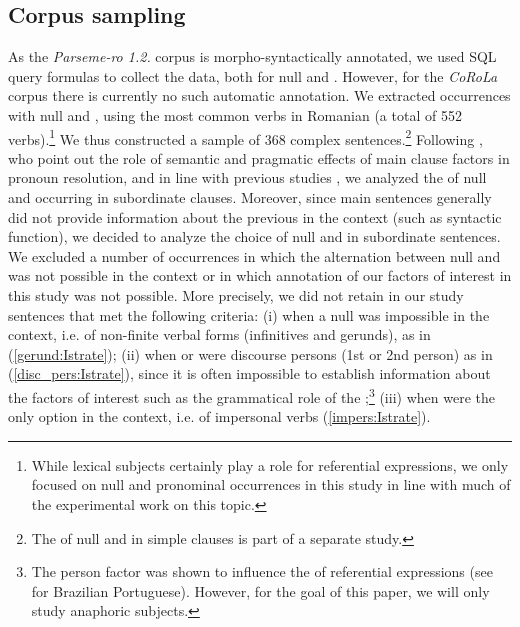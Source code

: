 \documentclass[output=paper,colorlinks,citecolor=brown]{langscibook}
\begin{document}
\subsection{Corpus sampling}
As the \textit{Parseme-ro 1.2.} corpus is morpho-syntactically annotated, we used SQL query formulas to collect the data, both for null and . However, for the \textit{CoRoLa} corpus there is currently no such automatic annotation. We extracted occurrences with null and , using the most common verbs  in Romanian (a total of 552 verbs).\footnote{While lexical subjects certainly play a role for referential expressions, we only focused on null and pronominal occurrences in this study in line with much of the experimental work on this topic.}
We thus constructed a sample of 368 complex sentences.\footnote{The  of null and  in simple clauses is part of a separate study.} Following \citet{oakhill1989line}, who point out the role of semantic and pragmatic effects of main clause factors in pronoun resolution, and in line with previous studies \citep{soares2020effect, costa2004semantic, de2013effects}, we analyzed the  of null and  occurring in  subordinate clauses. 
Moreover, since main sentences generally did not provide information about the previous  in the context (such as syntactic function), we decided to analyze the choice of null and  in subordinate sentences.
We excluded a number of occurrences in which the alternation between null and  was not possible in the context or in which annotation of our factors of interest in this study was not possible. More precisely, we did not retain in our study sentences that met the following criteria: (i) when a null  was impossible in the context, i.e.  of non-finite verbal forms (infinitives and gerunds), as in (\ref{gerund:Istrate}); (ii) when  or  were discourse persons (1st or 2nd person) as in (\ref{disc_pers:Istrate}), since it is often impossible to establish information about the factors of interest such as the grammatical role of the ;\footnote{The person factor was shown to influence the  of referential expressions (see \citealt{soares2020effect} for Brazilian Portuguese). However, for the goal of this paper, we will only study anaphoric subjects.} (iii) when  were the only option in the context, i.e.  of impersonal  verbs (\ref{impers:Istrate}).
\end{document}

